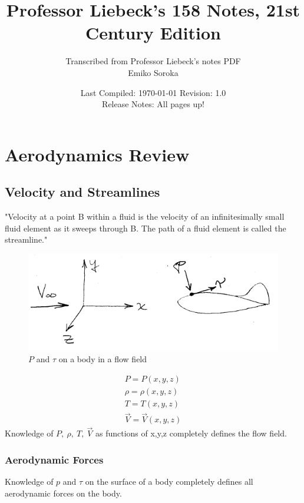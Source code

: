 \documentclass[draft=false, titlepage]{article}
\title{Professor Liebeck's 158 Notes, 21st Century Edition}
\author{Transcribed from Professor Liebeck's notes PDF\\
	\small Emiko Soroka}
\date{Last Compiled: \today\linebreak\linebreak
	\small Revision: 1.0\\
	Release Notes: All pages up!}
\begin{document}
\maketitle
\tableofcontents
\listoffigures
\listoftables
\pagebreak

\section{Aerodynamics Review}
\subsection{Velocity and Streamlines}
"Velocity at a point B within a fluid is the velocity of an infinitesimally small fluid element as it sweeps through B.
The path of a fluid element is called the streamline."

\begin{figure}[ht]
	\centering
	\includegraphics[width=0.5\linewidth]{Figures/p2_flowfield.PNG}
	\caption{$P$ and $\tau$ on a body in a flow field}
	\label{fig:p2_flowfield}
\end{figure}
\begin{gather*}
P = P(x,y,z)\\
\rho = \rho(x,y,z)\\
T = T(x,y,z)\\
\vec{V} = \vec{V}(x,y,z)
\end{gather*}
Knowledge of $P,\ \rho,\ T,\ \vec{V}$ as functions of x,y,z completely defines the flow field.

\subsubsection{Aerodynamic Forces}
Knowledge of $p$ and $\tau$ on the surface of a body completely defines all aerodynamic forces on the body.
\end{document}
